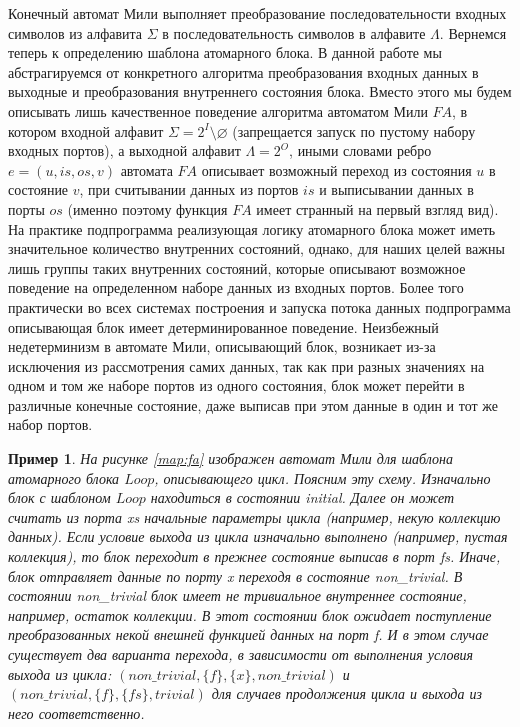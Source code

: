 \documentclass[10pt,a4paper]{article}
\newtheorem{example}{Пример}
\newcommand{\FA}{F\!A}
\begin{document}
Конечный автомат Мили выполняет преобразование последовательности входных символов из алфавита $\Sigma$ в последовательность символов в алфавите $\Lambda$.
Вернемся теперь к определению шаблона атомарного блока. В данной работе мы абстрагируемся от конкретного алгоритма преобразования входных данных в выходные
и преобразования внутреннего состояния блока. Вместо этого мы будем описывать лишь качественное поведение алгоритма автоматом Мили $\FA$, в котором входной алфавит
$\Sigma = 2^I \setminus \varnothing$ (запрещается запуск по пустому набору входных портов),
а выходной алфавит $\Lambda = 2^O$, иными словами ребро $e = (u, is, os, v)$ автомата $\FA$ описывает возможный переход из состояния $u$ в состояние $v$,
при считывании данных из портов $is$ и выписывании данных в порты $os$ (именно поэтому функция $\FA$ имеет странный на первый взгляд вид).
На практике подпрограмма реализующая логику атомарного блока может иметь значительное количество внутренних состояний,
однако, для наших целей важны лишь группы таких внутренних состояний, которые описывают возможное поведение на определенном наборе данных из входных портов.
Более того практически во всех системах построения и запуска потока данных подпрограмма описывающая блок имеет детерминированное поведение.
Неизбежный недетерминизм в автомате Мили, описывающий блок, возникает из-за исключения из рассмотрения самих данных,
так как при разных значениях на одном и том же наборе портов из одного состояния, блок может перейти в различные конечные состояние,
даже выписав при этом данные в один и тот же набор портов.

\begin{example}
  На рисунке \ref{map:fa} изображен автомат Мили для шаблона атомарного блока $Loop$, описывающего цикл. Поясним эту схему.
  Изначально блок с шаблоном $Loop$ находиться в состоянии \textit{initial}.
  Далее он может считать из порта \textit{xs} начальные параметры цикла (например, некую коллекцию данных).
  Если условие выхода из цикла изначально выполнено (например, пустая коллекция), то блок переходит в прежнее состояние выписав в порт \textit{fs}.
  Иначе, блок отправляет данные по порту \textit{x} переходя в состояние \textit{non\_trivial}. В состоянии \textit{non\_trivial} блок имеет не тривиальное внутреннее состояние,
  например, остаток коллекции. В этот состоянии блок ожидает поступление преобразованных некой внешней функцией данных на порт \textit{f}.
  И в этом случае существует два варианта перехода, в зависимости от выполнения условия выхода из цикла:
  $(non\_trivial, \{f\}, \{x\}, non\_trivial)$ и $(non\_trivial, \{f\}, \{fs\}, trivial)$ для случаев продолжения цикла и выхода из него соответственно.
\end{example}
\end{document}
